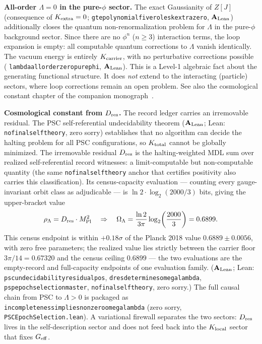 \documentclass[11pt]{article}
\theoremstyle{remark}
\newcommand{\lean}[1]{%
  \penalty-100
  \begingroup\def\_{\textunderscore\allowbreak}\texttt{#1}\endgroup}
\newcommand{\OmegaL}{\Omega_\Lambda}
\newcommand{\CatAL}{\ensuremath{\textbf{A}_{\rm Lean}}}
\begin{document}
\smallskip\noindent\textbf{All-order $\Lambda = 0$ in the pure-$\phi$ sector.}\enspace
The exact Gaussianity of $Z[J]$ (consequence of $K_{\rm extra} = 0$;
\lean{gte\_polynomial\_five\_roles\_k\_extra\_zero}, $\CatAL$) additionally closes the
quantum non-renormalization problem for $\Lambda$ in the pure-$\phi$ background sector.
Since there are no $\phi^n$ ($n \geq 3$) interaction terms, the loop expansion is empty:
all computable quantum corrections to $\Lambda$ vanish identically.  The vacuum energy
is entirely $K_{\rm carrier}$, with no perturbative corrections possible
(\lean{lambda\_all\_order\_zero\_pure\_phi}, $\CatAL$).  This is a Level-1 algebraic
fact about the generating functional structure.  It does \emph{not} extend to the
interacting (particle) sectors, where loop corrections remain an open problem.
See also the cosmological constant chapter of the companion
monograph~\cite{SpivackGTECompleteFramework}.

\noindent\textbf{Cosmological constant from $D_{\rm res}$.}
The record ledger carries an irremovable residual.  The PSC self-referential
undecidability theorem ($\CatAL$; Lean: \lean{no\_final\_self\_theory}, zero sorry)
establishes that no algorithm can decide the halting problem for all PSC
configurations, so $K_{\rm total}$ cannot be globally minimized.  The irremovable
residual $D_{\rm res}$ is the halting-weighted MDL sum over realized
self-referential record witnesses: a limit-computable but non-computable quantity
(the same \lean{no\_final\_self\_theory} anchor that certifies positivity also
carries this classification).  Its census-capacity evaluation --- counting every
gauge-invariant orbit class as adjudicable --- is $\ln 2 \cdot \log_2(2000/3)$
bits, giving the upper-bracket value
\[
  \rho_\Lambda = D_{\rm res}\cdot M_{\rm Pl}^2 \quad\Rightarrow\quad
  \OmegaL = \frac{\ln 2}{3\pi}\log_2\!\left(\frac{2000}{3}\right) = 0.6899.
\]
This census endpoint is within $+0.18\sigma$ of the Planck 2018 value
$0.6889\pm0.0056$, with zero free parameters; the realized value lies strictly
between the carrier floor $3\pi/14 = 0.67320$ and the census ceiling $0.6899$ ---
the two evaluations are the empty-record and full-capacity endpoints of one
evaluation family.
($\CatAL$; Lean: \lean{psc\_undecidability\_residual\_pos},
\lean{d\_res\_determines\_omega\_lambda}, \lean{psp\_epoch\_selection\_master},
\lean{no\_final\_self\_theory}, zero sorry.)
The full causal chain from PSC to $\Lambda > 0$ is packaged as
\lean{incompleteness\_implies\_nonzero\_omega\_lambda} (zero sorry,
\lean{PSCEpochSelection.lean}).
A variational firewall separates the two sectors: $D_{\rm res}$ lives in the
self-description sector and does not feed back into the $K_{\rm local}$ sector
that fixes $G_{\rm eff}$.
\end{document}
